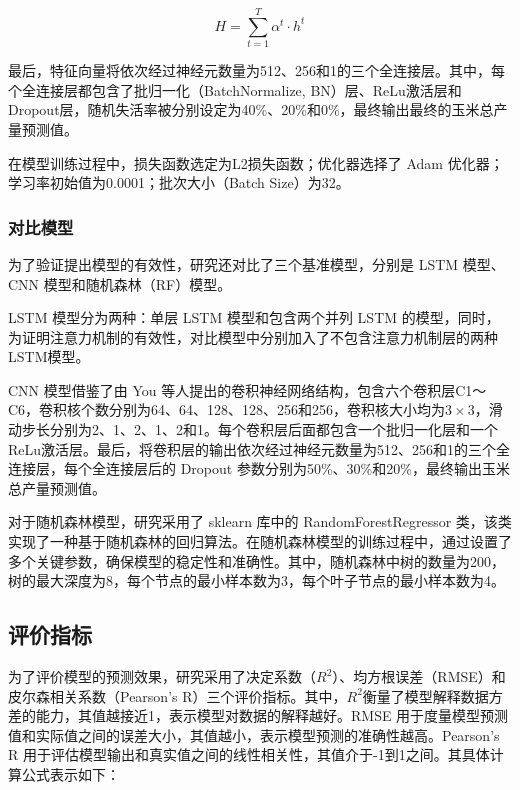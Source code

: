 \begin{equation}
  \label{equ:attention}
  H=\sum_{t=1}^T \alpha ^t\cdot h^t
\end{equation}

\par 最后，特征向量将依次经过神经元数量为512、256和1的三个全连接层。其中，每个全连接层都包含了批归一化（BatchNormalize, BN）层、ReLu激活层和Dropout层，随机失活率被分别设定为40\%、20\%和0\%，最终输出最终的玉米总产量预测值。

\par 在模型训练过程中，损失函数选定为L2损失函数；优化器选择了 Adam 优化器；学习率初始值为0.0001；批次大小（Batch Size）为32。

\subsubsection{对比模型}

\par 为了验证提出模型的有效性，研究还对比了三个基准模型，分别是 LSTM 模型、 CNN 模型和随机森林（RF）模型。

\par LSTM 模型分为两种：单层 LSTM 模型和包含两个并列 LSTM 的模型，同时，为证明注意力机制的有效性，对比模型中分别加入了不包含注意力机制层的两种LSTM模型。

\par CNN 模型借鉴了由 You 等人\cite{you2017deep}提出的卷积神经网络结构，包含六个卷积层C1～C6，卷积核个数分别为64、64、128、128、256和256，卷积核大小均为$3\times 3$，滑动步长分别为2、1、2、1、2和1。每个卷积层后面都包含一个批归一化层和一个ReLu激活层。最后，将卷积层的输出依次经过神经元数量为512、256和1的三个全连接层，每个全连接层后的 Dropout 参数分别为50\%、30\%和20\%，最终输出玉米总产量预测值。

\par 对于随机森林模型，研究采用了 sklearn 库中的 RandomForestRegressor 类，该类实现了一种基于随机森林的回归算法。在随机森林模型的训练过程中，通过设置了多个关键参数，确保模型的稳定性和准确性。其中，随机森林中树的数量为200，树的最大深度为8，每个节点的最小样本数为3，每个叶子节点的最小样本数为4。

\subsection{评价指标}

\par 为了评价模型的预测效果，研究采用了决定系数（$R^2$）、均方根误差（RMSE）和皮尔森相关系数（Pearson's R）三个评价指标。其中，$R^2$衡量了模型解释数据方差的能力，其值越接近1，表示模型对数据的解释越好。RMSE 用于度量模型预测值和实际值之间的误差大小，其值越小，表示模型预测的准确性越高。Pearson's R 用于评估模型输出和真实值之间的线性相关性，其值介于-1到1之间。其具体计算公式表示如下：

